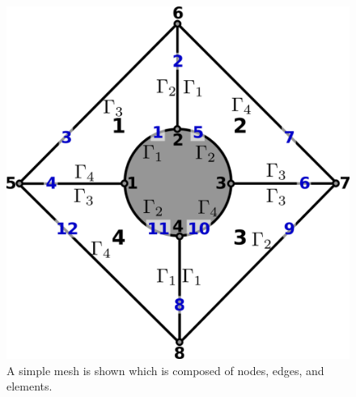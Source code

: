 \documentclass[12pt]{softwaremanual}
\begin{document}
\begin{figure}[h!]
\begin{center}
\includegraphics[scale=0.5]{figures/geometry/meshDepiction2D.png}
\caption{A simple mesh is shown which is composed of nodes, edges, and elements. } \label{fig:simplemesh}
\end{center}
\end{figure}
\end{document}
